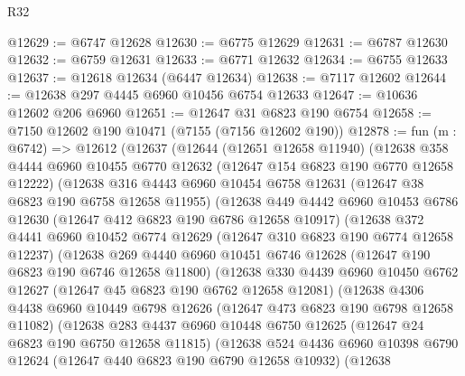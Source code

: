 \begin{lexlean}{R32}
\begin{coremodule}
@12629 := @6747 @12628
@12630 := @6775 @12629
@12631 := @6787 @12630
@12632 := @6759 @12631
@12633 := @6771 @12632
@12634 := @6755 @12633
@12637 := @12618 @12634 (@6447 @12634)
@12638 := @7117 @12602
@12644 := @12638 @297 @4445 @6960 @10456 @6754 @12633
@12647 := @10636 @12602 @206 @6960
@12651 := @12647 @31 @6823 @190 @6754
@12658 := @7150 @12602 @190 @10471 (@7155 (@7156 @12602 @190))
@12878 := fun (m : @6742) =>
  @12612
    (@12637
      (@12644
        (@12651 @12658 @11940)
        (@12638
          @358
          @4444
          @6960
          @10455
          @6770
          @12632
          (@12647 @154 @6823 @190 @6770 @12658 @12222)
          (@12638
            @316
            @4443
            @6960
            @10454
            @6758
            @12631
            (@12647 @38 @6823 @190 @6758 @12658 @11955)
            (@12638
              @449
              @4442
              @6960
              @10453
              @6786
              @12630
              (@12647 @412 @6823 @190 @6786 @12658 @10917)
              (@12638
                @372
                @4441
                @6960
                @10452
                @6774
                @12629
                (@12647 @310 @6823 @190 @6774 @12658 @12237)
                (@12638
                  @269
                  @4440
                  @6960
                  @10451
                  @6746
                  @12628
                  (@12647 @190 @6823 @190 @6746 @12658 @11800)
                  (@12638
                    @330
                    @4439
                    @6960
                    @10450
                    @6762
                    @12627
                    (@12647 @45 @6823 @190 @6762 @12658 @12081)
                    (@12638
                      @4306
                      @4438
                      @6960
                      @10449
                      @6798
                      @12626
                      (@12647 @473 @6823 @190 @6798 @12658 @11082)
                      (@12638
                        @283
                        @4437
                        @6960
                        @10448
                        @6750
                        @12625
                        (@12647 @24 @6823 @190 @6750 @12658 @11815)
                        (@12638
                          @524
                          @4436
                          @6960
                          @10398
                          @6790
                          @12624
                          (@12647 @440 @6823 @190 @6790 @12658 @10932)
                          (@12638

\end{coremodule}
\end{lexlean}
